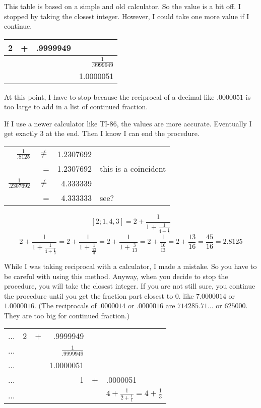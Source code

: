 \documentclass{jreport}
\begin{document}
This table is based on a simple and old calculator. So the value is a bit off. I stopped by taking the closest integer. However, I could take one more value if I continue.
\begin{table}[htbp]
\begin{center}
\begin{tabular}{|rrr|r|}
\hline
2 & + & .9999949 &\\
\hline
  &  &  & $\frac{1}{.9999949}$\\
  &  &  & 1.0000051\\
\hline
\end{tabular}
\end{center}
\end{table}

At this point, I have to stop because the reciprocal of a decimal like $.0000051$ is too large to add in a list of continued fraction.

If I use a newer calculator like TI-86, the values are more accurate. Eventually I get exactly $3$ at the end. Then I know I can end the procedure.
\begin{table}[htbp]
\begin{center}
\begin{tabular}{|rrr|l|}
\hline
$\frac{1}{.8125}$ & $\neq$ & 1.2307692 & \\
 & = & 1.2307692 & this is a coincident\\
\hline
$\frac{1}{.2307692}$ & $\neq$ & 4.333339 & \\
 & = & 4.333333 & see?\\
\hline
\end{tabular}
\end{center}
\end{table}

\[[2;1,4,3]=2+\frac{1}{1+\frac{1}{4+\frac{1}{3}}}\]
\[2+\frac{1}{1+\frac{1}{4+\frac{1}{3}}}=2+\frac{1}{1+\frac{1}{\frac{13}{3}}}=2+\frac{1}{1+\frac{3}{13}}=2+\frac{1}{\frac{16}{13}}=2+\frac{13}{16}=\frac{45}{16}=2.8125\]

While I was taking reciprocal with a calculator, I made a mistake. So you have to be careful with using this method. Anyway, when you decide to stop the procedure, you will take the closest integer. If you are not still sure, you continue the procedure until you get the fraction part closest to $0$. like $7.0000014$ or $1.0000016$. (The reciprocals of $.0000014$ or $.0000016$ are $714285.71$... or $625000$. They are too big for continued fraction.)

\begin{table}[htbp]
\begin{center}
\begin{tabular}{|lllrl|l|}
\hline
... & 2 & + & .9999949 &  & \\
... &  &  & $\frac{1}{.9999949}$ &  & \\
... &  &  & 1.0000051 &  & \\
... &  &  & 1 & + & .0000051\\
\hline
... &  &  &  &  & $4+\frac{1}{2+\frac{1}{1}}=4+\frac{1}{3}$\\
\hline
\end{tabular}
\end{center}
\end{table}
\end{document}
